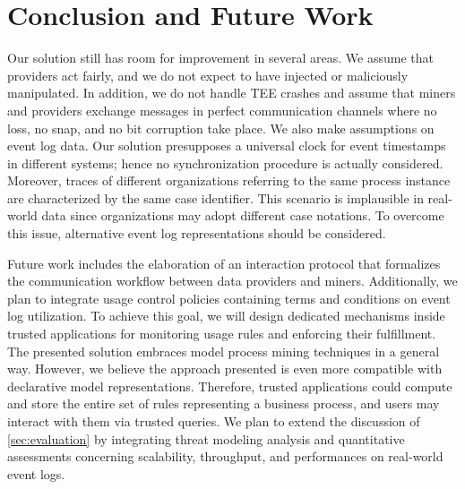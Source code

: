 \section{Conclusion and Future Work}
\label{sec:conclusion}


Our solution still has room for improvement in several areas. We assume that providers act fairly, and we do not expect to have injected or maliciously manipulated. In addition, we do not handle TEE crashes and assume that miners and providers exchange messages in perfect communication channels where no loss, no snap, and no bit corruption take place. We also make assumptions on event log data. Our solution presupposes a universal clock for event timestamps in different systems; hence no synchronization procedure is actually considered. Moreover, traces of different organizations referring to the same process instance are characterized by the same case identifier. This scenario is implausible in real-world data since organizations may adopt different case notations. To overcome this issue, alternative event log representations should be considered.

Future work includes the elaboration of an interaction protocol that formalizes the communication workflow between data providers and miners. Additionally, we plan to integrate usage control policies containing terms and conditions on event log utilization. To achieve this goal, we will design dedicated mechanisms inside trusted applications for monitoring usage rules and enforcing their fulfillment. The presented solution embraces model process mining techniques in a general way. However, we believe the approach presented is even more compatible with declarative model representations. Therefore, trusted applications could compute and store the entire set of rules representing a business process, and users may interact with them via trusted queries. We plan to extend the discussion of \cref{sec:evaluation} by integrating threat modeling analysis and quantitative assessments concerning scalability, throughput, and performances on real-world event logs.

